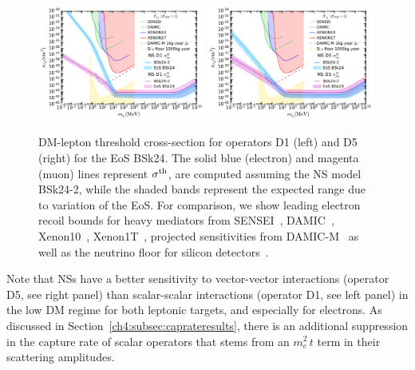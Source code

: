 \begin{figure}[t!bp]
    \centering
    \includegraphics[width=0.49\textwidth]{capture_2/DD_NS_leptons.pdf}
    \includegraphics[width=0.49\textwidth]{capture_2/DD_NS_leptons_D5.pdf}
    \caption[DM-lepton threshold cross-section for operators D1 (left) and D5 (right) for the EoS BSk24.]{DM-lepton threshold cross-section for operators D1 (left) and D5 (right) for the EoS BSk24. The solid blue (electron) and magenta (muon) lines represent $\sigma^{\rm th}$, are computed assuming the NS model BSk24-2, while the shaded bands represent the expected range due to variation of the EoS. For comparison, we show leading electron recoil bounds for heavy mediators from SENSEI~\cite{SENSEI:2020dpa_SENSEIDirectdetectionresults}, DAMIC~\cite{DAMIC:2019dcn_Constraintslightdark}, Xenon10~\cite{Essig:2017kqs_Newconstraintsprospects}, Xenon1T~\cite{XENON:2019gfn_Lightdarkmatter}, projected sensitivities from DAMIC-M~\cite{Essig:2015cda_DirectdetectionsubGeV} as well as the neutrino floor for silicon detectors~\cite{Essig:2018tss_Solarneutrinossignal}.}
        \label{ch4:fig:sigmathe}
\end{figure}

Note that NSs have a better sensitivity to vector-vector interactions (operator D5, see right panel) than scalar-scalar interactions (operator D1, see left panel) in the low DM regime for both leptonic targets, and especially for electrons. As discussed in Section~\ref{ch4:subsec:caprateresults}, there is an additional suppression in the capture rate of scalar operators that stems from an $m_e^2 \, t$ term in their scattering amplitudes. 

